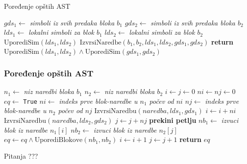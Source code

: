 \documentclass{beamer}
\begin{document}
\begin{frame}{Poređenje opštih AST}
    \begin{algorithmic}[1]
        \State $gds_1 \gets $ \emph{simboli iz svih predaka bloka $b_1$}
        \State $gds_2 \gets $ \emph{simboli iz svih predaka bloka $b_2$}
        \State $lds_1 \gets $ \emph{lokalni simboli za blok $b_1$}
        \State $lds_2 \gets $ \emph{lokalni simboli za blok $b_2$}
        \State $\text{UporediSim}(lds_1, lds_2)$
        \State $\text{IzvrsiNaredbe}(b_1, b_2, lds_1, lds_2, gds_1, gds_2)$
        \State \textbf{return} $\text{UporediSim}(lds_1, lds_2) \wedge \text{UporediSim}(gds_1, gds_2)$
        \EndProcedure
    \end{algorithmic}
\end{frame}

\begin{frame}[fragile]
    \frametitle{{Poređenje opštih AST}}
    \scriptsize
    \begin{algorithmic}[1]
    \State $n_1 \gets $ \emph{niz naredbi bloka $b_1$} 
    \State $n_2 \gets $ \emph{niz naredbi bloka $b_2$}
    \State $i \gets j \gets 0$
    \State $ni \gets nj \gets 0$
    \State $eq \gets $ \texttt{True}
        \State $ni \gets $ \emph{indeks prve blok-naredbe u $n_1$ počev od $ni$}
        \State $nj \gets $ \emph{indeks prve blok-naredbe u $n_2$ počev od $nj$}
            \State $\text{IzvrsiNaredbu}(naredba, lds_1, gds_1)$
        \EndFor
        \State $i \gets i + ni$
            \State $\text{IzvrsiNaredbu}(naredba, lds_2, gds_2)$
        \EndFor
        \State $j \gets j + nj$
            \State \textbf{prekini petlju}
        \EndIf
        \State $nb_1 \gets $ \emph{izvuci blok iz naredbe $n_1[i]$}
        \State $nb_2 \gets $ \emph{izvuci blok iz naredbe $n_2[j]$}
        \State $eq \gets eq \wedge \text{UporediBlokove}(nb_1, nb_2)$
        \State $i \gets i + 1$
        \State $j \gets j + 1$
    \EndWhile
    \State \textbf{return} $eq$
    \EndProcedure
    \end{algorithmic}
\end{frame}

\begin{frame}{Pitanja}
    \centering
    ???
\end{frame}
\end{document}
